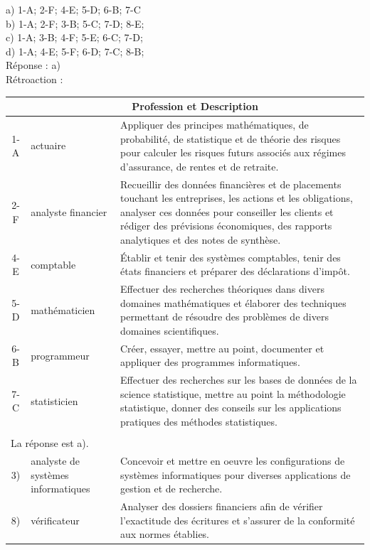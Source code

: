 \documentclass[letterpaper, 12pt]{article}
\begin{document}
a) 1-A; 2-F; 4-E; 5-D; 6-B; 7-C\\
b) 1-A; 2-F; 3-B; 5-C; 7-D; 8-E;\\
c) 1-A; 3-B; 4-F; 5-E; 6-C; 7-D;\\
d) 1-A; 4-E; 5-F; 6-D; 7-C; 8-B;\\

R\'eponse : a)\\

R\'etroaction :\\
\begin{center}
\begin{tabular}{|c|l|p{10cm}|} \cline{2-3}
\multicolumn{1}{c|}{} & \multicolumn{2}{|c|}{\bf Profession et Description}\\ \hline
1-A & actuaire & Appliquer des principes math\'ematiques, de probabilit\'e, de statistique et de th\'eorie des risques pour calculer les risques futurs associ\'es aux r\'egimes d'assurance, de rentes et de retraite.\\ \hline
2-F & analyste financier & Recueillir des donn\'ees financi\`eres et de placements touchant les entreprises, les actions et les obligations, analyser ces donn\'ees pour conseiller les clients et r\'ediger des pr\'evisions \'economiques, des rapports analytiques et des notes de synth\`ese.\\ \hline
4-E & comptable & \'Etablir et tenir des syst\`emes comptables, tenir des \'etats financiers et pr\'eparer des d\'eclarations d'imp\^ot.\\ \hline
5-D & math\'ematicien & Effectuer des recherches th\'eoriques dans divers domaines math\'ematiques et \'elaborer des techniques permettant de r\'esoudre des probl\`emes de divers domaines scientifiques.\\ \hline
6-B & programmeur & Cr\'eer, essayer, mettre au point, documenter et appliquer des programmes informatiques.\\ \hline
7-C & statisticien & Effectuer des recherches sur les bases de donn\'ees de la science statistique, mettre au point la m\'ethodologie statistique, donner des conseils sur les applications pratiques des m\'ethodes statistiques.\\ \hline
\multicolumn{3}{c}{}\\
\multicolumn{3}{l}{La r\'eponse est a).}\\[4mm] \hline
3) & analyste de syst\`emes informatiques & Concevoir et mettre en oeuvre les configurations de syst\`emes informatiques pour diverses applications de gestion et de recherche.\\ \hline
8) & v\'erificateur & Analyser des dossiers financiers afin de v\'erifier l'exactitude des \'ecritures et s'assurer de la conformit\'e aux normes \'etablies.\\ \hline
\end{tabular}
\end{center}
\end{document}
